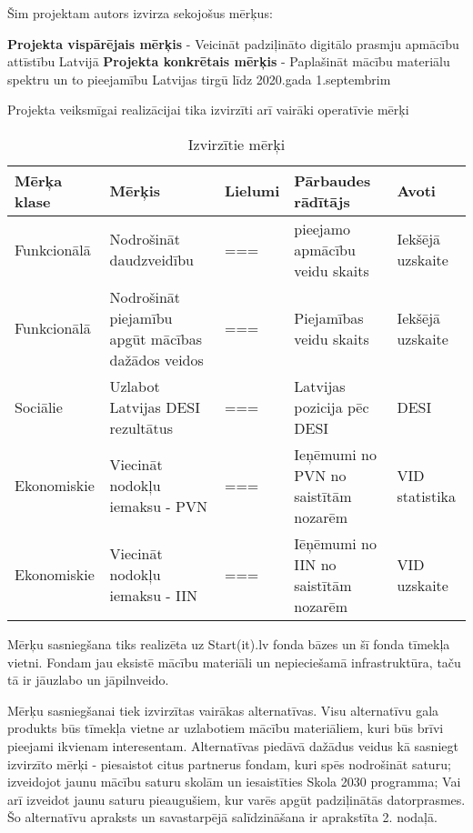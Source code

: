 \par
Šim projektam autors izvirza sekojošus mērķus:
\par
\textbf{Projekta vispārējais mērķis} - Veicināt padziļināto digitālo prasmju apmācību attīstību Latvijā
\textbf{Projekta konkrētais mērķis} - Paplašināt mācību materiālu spektru un to pieejamību Latvijas tirgū līdz
 2020.gada 1.septembrim
\par
Projekta veiksmīgai realizācijai tika izvirzīti arī vairāki operatīvie mērķi
\begin{table}[!ht]
    \centering
    \begin{tabular}{|p{}|p{}|p{}|p{}|p{}|}
        \hline
        \textbf{Mērķa klase} & \textbf{Mērķis} & \textbf{Lielumi} &\textbf{Pārbaudes rādītājs} & \textbf{Avoti} \\
        \hline
        Funkcionālā & Nodrošināt daudzveidību & === & pieejamo apmācību veidu skaits & Iekšējā uzskaite \\
        \hline
        Funkcionālā & Nodrošināt piejamību apgūt mācības dažādos veidos & === & Piejamības veidu skaits & Iekšējā uzskaite \\ %
        \hline
        Sociālie & Uzlabot Latvijas DESI rezultātus &  === & Latvijas pozicija pēc DESI & DESI \\
        \hline
        Ekonomiskie & Viecināt nodokļu iemaksu - PVN & === & Ieņēmumi no PVN no saistītām nozarēm & VID statistika \\
        \hline
        Ekonomiskie & Viecināt nodokļu iemaksu - IIN & === & Iēņēmumi no IIN no saistītām nozarēm & VID uzskaite \\
        \hline
    \end{tabular}
    \caption{Izvirzītie mērķi}
    \label{table:merki}
\end{table}
\par
Mērķu sasniegšana tiks realizēta uz Start(it).lv fonda bāzes un šī fonda tīmekļa vietni. Fondam jau
eksistē mācību materiāli un nepieciešamā infrastruktūra, taču tā ir jāuzlabo un jāpilnveido.
\par
Mērķu sasniegšanai tiek izvirzītas vairākas alternatīvas. Visu alternatīvu gala produkts būs tīmekļa vietne
ar uzlabotiem mācību materiāliem, kuri būs brīvi pieejami ikvienam interesentam. Alternatīvas piedāvā dažādus
veidus kā sasniegt izvirzīto mērķi - piesaistot citus partnerus fondam, kuri spēs nodrošināt saturu; 
izveidojot jaunu mācību saturu skolām un iesaistīties Skola 2030 programma; Vai arī izveidot jaunu saturu
pieaugušiem, kur varēs apgūt padziļinātās datorprasmes. Šo alternatīvu apraksts un savastarpējā salīdzināšana 
ir aprakstīta 2. nodaļā.